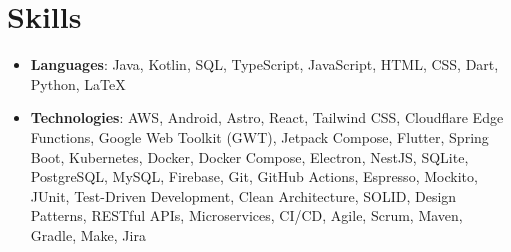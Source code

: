 \documentclass[letterpaper,11pt]{article}
\newcommand{\resumeSubHeadingListStart}{\begin{itemize}[leftmargin=*]}
\newcommand{\resumeSubHeadingListEnd}{\end{itemize}}
\begin{document}
\section{Skills}
\resumeSubHeadingListStart
\item{
            \textbf{Languages}{: Java, Kotlin, SQL, TypeScript, JavaScript, HTML, CSS, Dart, Python, LaTeX}

      }
\item {
            \textbf{Technologies}{: AWS, Android, Astro, React, Tailwind CSS, Cloudflare Edge Functions, Google Web Toolkit (GWT), Jetpack Compose, Flutter, Spring Boot, Kubernetes, Docker, Docker Compose, Electron, NestJS, SQLite, PostgreSQL, MySQL, Firebase, Git, GitHub Actions, Espresso, Mockito, JUnit, Test-Driven Development, Clean Architecture, SOLID, Design Patterns, RESTful APIs, Microservices, CI/CD, Agile, Scrum, Maven, Gradle, Make, Jira}
      }
\resumeSubHeadingListEnd


\end{document}
